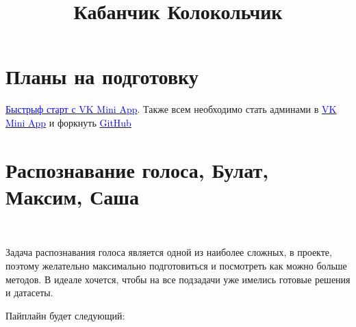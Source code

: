 \documentclass[11pt]{article}
\begin{document}
\title{Кабанчик Колокольчик}
\maketitle

\section*{Планы на подготовку}

\href{https://vk.com/@vkappsdev-quick-start}{\textcolor{blue}{Быстрыф старт с VK Mini App}}. Также всем необходимо стать админами в \href{vk.com/app7119135}{\textcolor{blue}{VK Mini App}} и форкнуть \href{https://github.com/maximzubkov/on_hack}{\textcolor{blue}{GitHub}}
\section{Распознавание голоса, {Булат, Максим, Саша}}

\

Задача распознавания голоса является одной из наиболее сложных, в проекте, поэтому желательно максимально подготовиться и посмотреть как можно больше методов. В идеале хочется, чтобы на все подзадачи уже имелись готовые решения и датасеты.

Пайплайн будет следующий:
\end{document}
